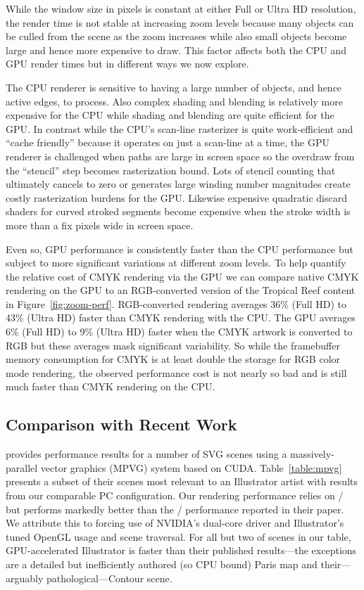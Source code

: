 While the window size in pixels is constant at either Full or Ultra
HD resolution, the render time is not stable at increasing zoom levels
because many objects can be culled from the scene as the zoom increases
while also small objects become large and hence more expensive to draw.
This factor affects both the CPU and GPU render times but in different
ways we now explore.

The CPU renderer is sensitive to having a large number of objects, and
hence active edges, to process.  Also complex shading and blending is
relatively more expensive for the CPU while shading and blending are
quite efficient for the GPU.  In contrast while the CPU's scan-line 
rasterizer is quite work-efficient and ``cache friendly'' because it operates
on just a scan-line at a time, the GPU renderer is challenged when
paths are large in screen space so the overdraw from the ``stencil'' step
becomes rasterization bound.  Lots of stencil counting that ultimately cancels to zero or
generates large winding number magnitudes create costly rasterization burdens for the GPU.
Likewise expensive quadratic discard shaders for curved stroked segments become
expensive when the stroke width is more than a fix pixels wide in screen space.

Even so, GPU performance is consistently faster than the CPU performance but subject
to more significant variations at different zoom levels.  To help quantify the relative
cost of CMYK rendering via the GPU we can compare native CMYK rendering on the GPU to
an RGB-converted version of the Tropical Reef content in Figure~\ref{fig:zoom-perf}.
RGB-converted rendering averages
36\% (Full HD) to 43\% (Ultra HD) faster than CMYK rendering with the CPU.
The GPU averages 6\% (Full HD) to 9\% (Ultra HD) faster when the
CMYK artwork is converted to RGB but these averages mask significant
variability.  So while the framebuffer memory consumption for CMYK is at least double
the storage for RGB color mode rendering, the observed performance cost is not nearly so bad
and is still much faster than CMYK rendering on the CPU.

\subsection{Comparison with Recent Work}
\label{sec:mpvg}

\cite{GanEtAl14} provides performance results for a number of SVG scenes
using a massively-parallel vector graphics (MPVG) system based on CUDA.  Table~\ref{table:mpvg}
presents a subset of their scenes most relevant to an Illustrator artist with results from our comparable PC configuration.  Our rendering performance relies on
\NVpr/ but performs markedly better than the \NVpr/ performance reported in their paper.
We attribute this to forcing use of NVIDIA's dual-core
driver and Illustrator's tuned OpenGL usage and scene traversal.
For all but two of scenes in our table, GPU-accelerated Illustrator is faster than their published results---the
exceptions are a detailed but inefficiently authored (so CPU bound) Paris map and their---arguably pathological---Contour scene.

